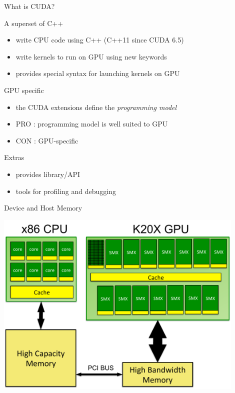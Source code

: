 \documentclass[aspectratio=43]{beamer}
\begin{document}
\begin{frame}[fragile]{What is CUDA?}
    \begin{info}{A superset of C++}
        \begin{itemize}
            \item write CPU code using C++ (C++11 since CUDA 6.5)
            \item write kernels to run on GPU using new keywords
            \item provides special syntax for launching kernels on GPU
        \end{itemize}
    \end{info}

    \begin{info}{GPU specific}
        \begin{itemize}
            \item the CUDA extensions define the \emph{programming model}
            \item PRO : programming model is well suited to GPU
            \item CON : GPU-specific
        \end{itemize}
    \end{info}

    \begin{info}{Extras}
        \begin{itemize}
            \item provides library/API
            \item tools for profiling and debugging
        \end{itemize}
    \end{info}
\end{frame}

\begin{frame}[fragile]{Device and Host Memory}
    \begin{center}
        \includegraphics[width=0.9\textwidth]{./images/node.pdf}
    \end{center}
\end{frame}
\end{document}
